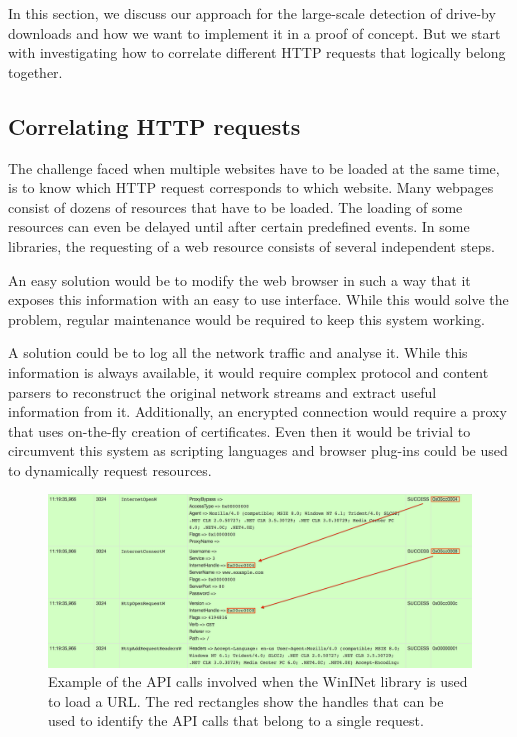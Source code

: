 In this section, we discuss our approach for the large-scale detection of drive-by downloads and how we want to implement it in a proof of concept. But we start with investigating how to correlate different HTTP requests that logically belong together.

\subsection{Correlating HTTP requests}
\label{sigh}

The challenge faced when multiple websites have to be loaded at the same time, is to know which HTTP request corresponds to which website. Many webpages consist of dozens of resources that have to be loaded. The loading of some resources can even be delayed until after certain predefined events. In some libraries, the requesting of a web resource consists of several independent steps.

An easy solution would be to modify the web browser in such a way that it exposes this information with an easy to use interface. While this would solve the problem, regular maintenance would be required to keep this system working. 

A solution could be to log all the network traffic and analyse it. While this information is always available, it would require complex protocol and content parsers to reconstruct the original network streams and extract useful information from it. Additionally, an encrypted connection would require a proxy that uses on-the-fly creation of certificates. Even then it would be trivial to circumvent this system as scripting languages and browser plug-ins could be used to dynamically request resources.

\begin{figure}[h]
    \centering
    \includegraphics[width=14.7cm]{Images/wininet.png}
    \caption{Example of the API calls involved when the WinINet library is used to load a URL. The red rectangles show the handles that can be used to identify the API calls that belong to a single request.}
    \label{fig:wininet}
\end{figure}

